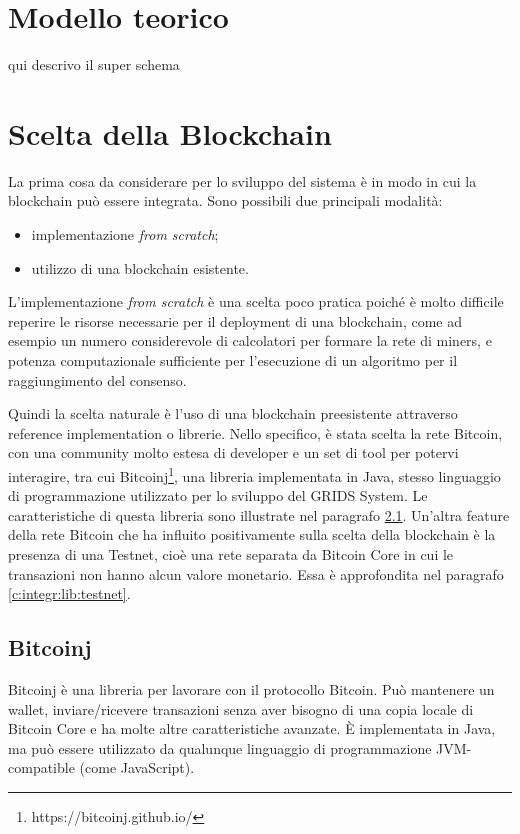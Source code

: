 \section{Modello teorico}
\label{c:integr:model}

qui descrivo il super schema

\section{Scelta della Blockchain}
\label{c:integr:lib}

La prima cosa da considerare per lo sviluppo del sistema è in modo in cui la blockchain può essere integrata. Sono possibili due principali modalità:
\begin{itemize}
    \item implementazione \textit{from scratch};
    \item utilizzo di una blockchain esistente.
\end{itemize}

L'implementazione \textit{from scratch} è una scelta poco pratica poiché è molto difficile reperire le risorse necessarie per il deployment di una blockchain, come ad esempio un numero considerevole di calcolatori per formare la rete di miners, e potenza computazionale sufficiente per l'esecuzione di un algoritmo per il raggiungimento del consenso.

Quindi la scelta naturale è l'uso di una blockchain preesistente attraverso reference implementation o librerie. Nello specifico, è stata scelta la rete Bitcoin, con una community molto estesa di developer e un set di tool per potervi interagire, tra cui Bitcoinj\footnote{https://bitcoinj.github.io/}, una libreria implementata in Java, stesso linguaggio di programmazione utilizzato per lo sviluppo del GRIDS System. Le caratteristiche di questa libreria sono illustrate nel paragrafo \ref{c:integr:lib:bitcoinj}.
Un'altra feature della rete Bitcoin che ha influito positivamente sulla scelta della blockchain è la presenza di una Testnet, cioè una rete separata da Bitcoin Core in cui le transazioni non hanno alcun valore monetario. Essa è approfondita nel paragrafo \ref{c:integr:lib:testnet}.


\subsection{Bitcoinj}
\label{c:integr:lib:bitcoinj}

Bitcoinj è una libreria per lavorare con il protocollo Bitcoin. Può mantenere un wallet, inviare/ricevere transazioni senza aver bisogno di una copia locale di Bitcoin Core e ha molte altre caratteristiche avanzate. È implementata in Java, ma può essere utilizzato da qualunque linguaggio di programmazione JVM-compatible (come JavaScript).

